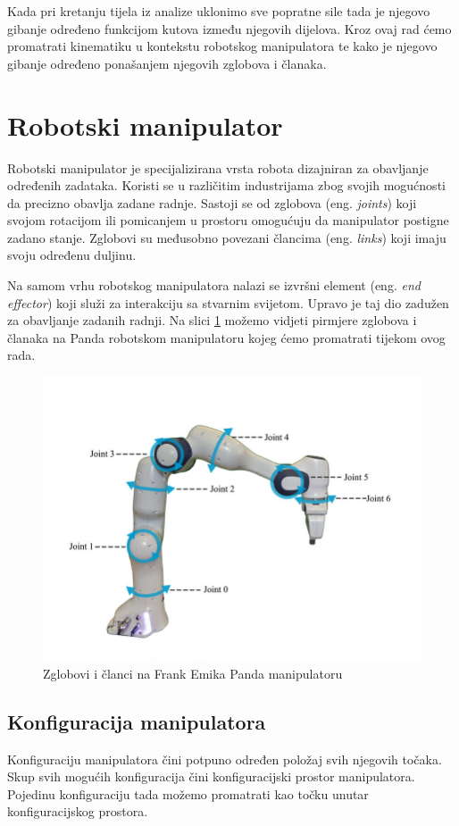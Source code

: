 \documentclass[times, utf8, diplomskirad]{fer}
\begin{document}
Kada pri kretanju tijela iz analize uklonimo sve popratne sile tada je njegovo gibanje određeno funkcijom kutova između njegovih dijelova.
Kroz ovaj rad ćemo promatrati kinematiku u kontekstu robotskog manipulatora te kako je njegovo gibanje određeno ponašanjem njegovih zglobova i članaka.

\section{Robotski manipulator}
Robotski manipulator je specijalizirana vrsta robota dizajniran za obavljanje određenih zadataka.
Koristi se u različitim industrijama zbog svojih mogućnosti da precizno obavlja zadane radnje.
Sastoji se od zglobova (eng. \textit{joints}) koji svojom rotacijom ili pomicanjem u prostoru omogućuju da manipulator postigne zadano stanje.
Zglobovi su međusobno povezani člancima (eng. \textit{links}) koji imaju svoju određenu duljinu.

Na samom vrhu robotskog manipulatora nalazi se izvršni element (eng. \textit{end effector}) koji služi za interakciju sa stvarnim svijetom.
Upravo je taj dio zadužen za obavljanje zadanih radnji.
Na slici \ref{fig:panda-zglob} možemo vidjeti pirmjere zglobova i članaka na Panda robotskom manipulatoru kojeg ćemo promatrati tijekom ovog rada.
\begin{figure}[H]
    \centering
    \includegraphics[width=12cm]{img/panda-links-and-joints}
    \caption{Zglobovi i članci na Frank Emika Panda manipulatoru\protect\footnotemark}
    \label{fig:panda-zglob}
\end{figure}

\subsection{Konfiguracija manipulatora}
Konfiguraciju manipulatora čini potpuno određen položaj svih njegovih točaka.
Skup svih mogućih konfiguracija čini konfiguracijski prostor manipulatora.
Pojedinu konfiguraciju tada možemo promatrati kao točku unutar konfiguracijskog prostora.
\end{document}
